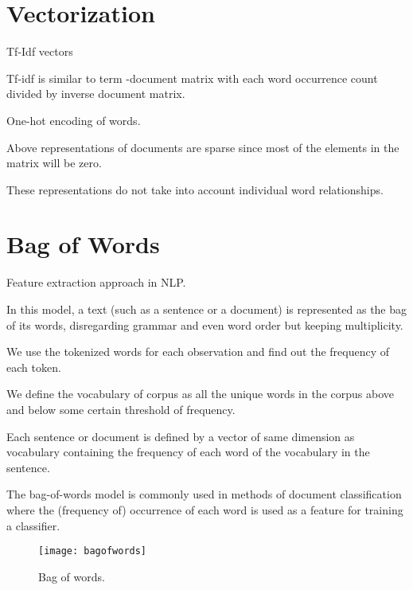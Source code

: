 	\section{Vectorization}
	\begin{bulletedlist}
		\item Tf-Idf vectors
		\begin{bulletedlist}
			\item Tf-idf is similar to term -document matrix with each word occurrence count divided by inverse document matrix.
		\end{bulletedlist}
		\item One-hot encoding of words.
		\item Above representations of documents are sparse since most of the elements in the matrix will be zero.
		\item These representations do not take into account individual word relationships.
	\end{bulletedlist}

	\section{Bag of Words}

	\begin{bulletedlist}
		\item Feature extraction approach in NLP.
		\item In this model, a text (such as a sentence or a document) is represented as the bag of its words, disregarding grammar and even word order but keeping multiplicity.
		\item We use the tokenized words for each observation and find out the frequency of each token.
		\item We define the vocabulary of corpus as all the unique words in the corpus above and below some certain threshold of frequency.
		\item Each sentence or document is defined by a vector of same dimension as vocabulary containing the frequency of each word of the vocabulary in the sentence.
		\item The bag-of-words model is commonly used in methods of document classification where the (frequency of) occurrence of each word is used as a feature for training a classifier.
	\end{bulletedlist}

	\begin{figure}[h]
		\centering
		\texttt{[image: bagofwords]}
		\caption[Bag of words]{Bag of words.}
		\label{fig:bagofwords}
	\end{figure}


